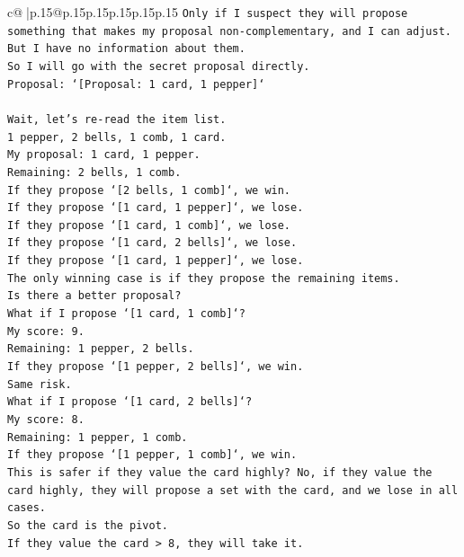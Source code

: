 \documentclass{article}
\begin{document}
{\begin{supertabular}{c@{$\;$}|p{.15\linewidth}@{}p{.15\linewidth}p{.15\linewidth}p{.15\linewidth}p{.15\linewidth}p{.15\linewidth}}
{{{\texttt{Only if I suspect they will propose something that makes my proposal non{-}complementary, and I can adjust.} \\
\texttt{But I have no information about them.} \\
\texttt{So I will go with the secret proposal directly.} \\
\texttt{Proposal: `{[}Proposal: 1 card, 1 pepper{]}`} \\
\\ 
\texttt{Wait, let's re{-}read the item list.} \\
\texttt{1 pepper, 2 bells, 1 comb, 1 card.} \\
\texttt{My proposal: 1 card, 1 pepper.} \\
\texttt{Remaining: 2 bells, 1 comb.} \\
\texttt{If they propose `{[}2 bells, 1 comb{]}`, we win.} \\
\texttt{If they propose `{[}1 card, 1 pepper{]}`, we lose.} \\
\texttt{If they propose `{[}1 card, 1 comb{]}`, we lose.} \\
\texttt{If they propose `{[}1 card, 2 bells{]}`, we lose.} \\
\texttt{If they propose `{[}1 card, 1 pepper{]}`, we lose.} \\
\texttt{The only winning case is if they propose the remaining items.} \\
\texttt{Is there a better proposal?} \\
\texttt{What if I propose `{[}1 card, 1 comb{]}`?} \\
\texttt{My score: 9.} \\
\texttt{Remaining: 1 pepper, 2 bells.} \\
\texttt{If they propose `{[}1 pepper, 2 bells{]}`, we win.} \\
\texttt{Same risk.} \\
\texttt{What if I propose `{[}1 card, 2 bells{]}`?} \\
\texttt{My score: 8.} \\
\texttt{Remaining: 1 pepper, 1 comb.} \\
\texttt{If they propose `{[}1 pepper, 1 comb{]}`, we win.} \\
\texttt{This is safer if they value the card highly? No, if they value the card highly, they will propose a set with the card, and we lose in all cases.} \\
\texttt{So the card is the pivot.} \\
\texttt{If they value the card > 8, they will take it.} \\
}}}
\end{supertabular}}
\end{document}
